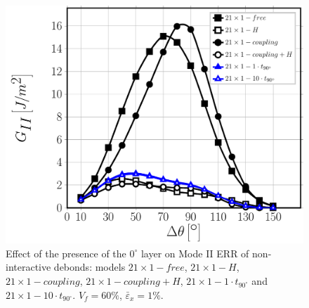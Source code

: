 \begin{figure}[!htb]
\centering
\includegraphics[width=\textwidth]{paperC/nx1-1-vf60-GII.pdf}
\caption{Effect of the presence of the $0^{\circ}$ layer on Mode II ERR of non-interactive debonds: models $21\times 1-free$, $21\times 1-H$, $21\times 1-coupling$, $21\times 1-coupling+H$, $21\times 1-1\cdot t_{90^{\circ}}$ and $21\times 1-10\cdot t_{90^{\circ}}$. $V_{f}=60\%$, $\bar{\varepsilon}_{x}=1\%$.}\label{paperC:fig:debonddebondGII}
\end{figure}

